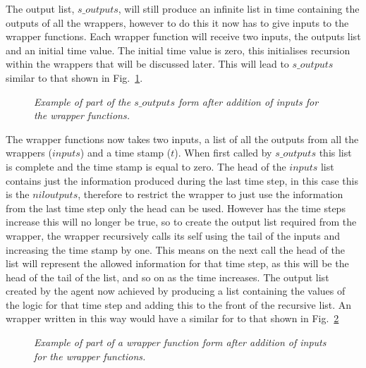\documentclass{article}
\begin{document}
The output list, $s\_outputs$, will still produce an infinite list in time containing the outputs of all the wrappers, however to do this it now has to give inputs to the wrapper functions. Each wrapper function will receive two inputs, the outputs list and an initial time value. The initial time value is zero, this initialises recursion within the wrappers that will be discussed later.  This will lead to $s\_outputs$ similar to that shown in Fig.~\ref{fig:souts4}.
\begin{figure}[H]
	\centering
	
	\caption{\it Example of part of the $s\_outputs$ form after addition of inputs for the wrapper functions.}
	\label{fig:souts4}
\end{figure} 


The wrapper functions now takes two inputs, a list of all the outputs from all the wrappers ($inputs$) and a time stamp ($t$). When first called by $s\_outputs$ this list is complete and the time stamp is equal to zero. The head of the $inputs$ list contains just the information produced during the last time step, in this case this is the $niloutputs$, therefore to restrict the wrapper to just use the information from the last time step only the head can be used. However has the time steps increase this will no longer be true, so to create the output list required from the wrapper, the wrapper recursively calls its self using the tail of the inputs and increasing the time stamp by one. This means on the next call the head of the list will represent the allowed information for that time step, as this will be the head of the tail of the list, and so on as the time increases. The output list created by the agent now achieved by producing a list containing the values of the logic for that time step and adding this to the front of the recursive list. An wrapper written in this way would have a similar for to that shown in Fig.~\ref{fig:wrap4}
\begin{figure}[H]
	\centering
	
	\caption{\it Example of part of a wrapper function form after addition of inputs for the wrapper functions.}
	\label{fig:wrap4}
\end{figure} 
\end{document}
